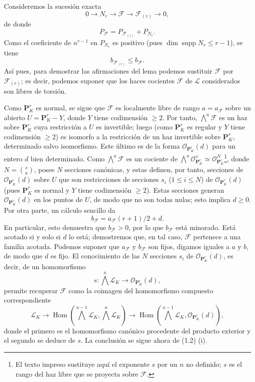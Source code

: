 Consideremos la sucesión exacta
\[
0\longrightarrow N_r\longrightarrow\mathcal F
\longrightarrow\mathcal F_{(r)}\longrightarrow0,
\]
de donde
\[
P_{\mathcal F}=P_{\mathcal F_{(r)}}+P_{N_r}.
\]
Como el coeficiente de $n^{r-1}$ en $P_{N_r}$ es positivo (pues
$\dim\operatorname{supp}N_r\leq r-1$), se tiene
\[
b_{\mathcal F_{(r)}}\leq b_{\mathcal F}.
\]
Así pues, para demostrar las afirmaciones del lema podemos sustituir
$\mathcal F$ por $\mathcal F_{(r)}$; es decir, podemos suponer que los haces
cocientes $\mathcal F$ de $\mathcal L$ considerados son libres de torsión.

Como $\mathbf P^r_K$ es normal, se sigue que $\mathcal F$ es localmente libre
de rango $a=a_{\mathcal F}$ sobre un abierto $U=\mathbf P^r_K-Y$, donde $Y$
tiene codimensión $\geq2$. Por tanto, $\bigwedge^a\mathcal F$ es un haz sobre
$\mathbf P^r_K$ cuya restricción a $U$ es invertible; luego (como
$\mathbf P^r_K$ es regular y $Y$ tiene codimensión $\geq2$) es isomorfo a la
restricción de un haz invertible sobre $\mathbf P^r_K$, determinado salvo
isomorfismo. Este último es de la forma $\mathcal O_{\mathbf P^r_K}(d)$ para
un entero $d$ bien determinado. Como $\bigwedge^a\mathcal F$ es un cociente
de $\bigwedge^a\mathcal O_{\mathbf P^r_K}^{s}\simeq
\mathcal O_{\mathbf P^r_K}^{N}$\footnote{El texto impreso sustituye aquí el
exponente $s$ por un $n$ no definido; $s$ es el rango del haz libre que se
proyecta sobre $\mathcal F$.}, donde $N=\binom{s}{a}$, posee $N$ secciones
canónicas, y estas definen, por tanto, secciones de
$\mathcal O_{\mathbf P^r_K}(d)$ sobre $U$ que son restricciones de secciones
$s_i$ ($1\leq i\leq N$) de $\mathcal O_{\mathbf P^r_K}(d)$ (pues
$\mathbf P^r_K$ es normal y $Y$ tiene codimensión $\geq2$). Estas secciones
generan $\mathcal O_{\mathbf P^r_K}(d)$ en los puntos de $U$, de modo que no
son todas nulas; esto implica $d\geq0$. Por otra parte, un cálculo sencillo da
\[
b_{\mathcal F}=a_{\mathcal F}(r+1)/2+d.
\]
En particular, esto demuestra que $b_{\mathcal F}>0$, por lo que
$b_{\mathcal F}$ está minorado. Está acotado si y solo si $d$ lo está;
demostremos que, en tal caso, $\mathcal F$ pertenece a una familia acotada.
Podemos suponer que $a_{\mathcal F}$ y $b_{\mathcal F}$ son fijos, digamos
iguales a $a$ y $b$, de modo que $d$ es fijo. El conocimiento de las $N$
secciones $s_i$ de $\mathcal O_{\mathbf P^r_K}(d)$, es decir, de un
homomorfismo
\[
s:\bigwedge^a\mathcal L_K\longrightarrow\mathcal O_{\mathbf P^r_K}(d),
\]
permite recuperar $\mathcal F$ como la coimagen del homomorfismo compuesto
correspondiente
\[
\mathcal L_K\longrightarrow
\operatorname{Hom}\!\left(\bigwedge^{a-1}\mathcal L_K,
\bigwedge^a\mathcal L_K\right)\longrightarrow
\operatorname{Hom}\!\left(\bigwedge^{a-1}\mathcal L_K,
\mathcal O_{\mathbf P^r_K}(d)\right),
\]
donde el primero es el homomorfismo canónico procedente del producto exterior
y el segundo se deduce de $s$. La conclusión se sigue ahora de (1.2) (i).


